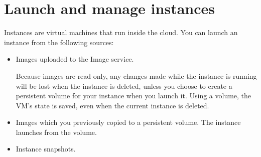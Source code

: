 \chapter{Launch and manage instances}\label{cha:launch-manage-inst}
Instances are virtual machines that run inside the cloud. You can launch
an \gls{instance} from the following sources:

\begin{itemize}
\item Images uploaded to the Image service.

   Because images are read-only, any changes made while
  the instance is running will be lost when the instance is deleted,
  unless you choose to create a persistent volume for your instance
  when you launch it.  Using a volume, the VM's state is saved, even
  when the current instance is deleted.
\item Images which you previously copied to a persistent volume. The
  instance launches from the volume.
\item Instance snapshots.
\end{itemize}

